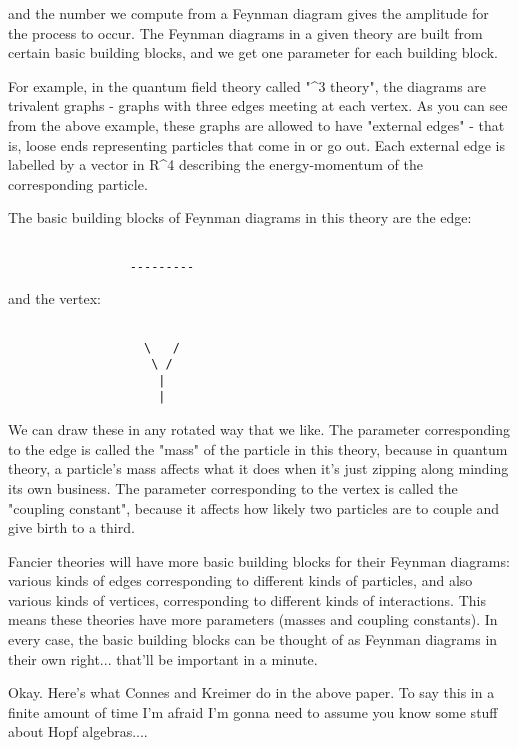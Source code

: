 and the number we compute from a Feynman diagram gives the amplitude 
for the process to occur.  The Feynman diagrams in a given theory 
are built from certain basic building blocks, and we get one parameter 
for each building block.  

For example, in the quantum field theory called "\phi ^3 theory", the 
diagrams are trivalent graphs - graphs with three edges meeting at 
each vertex.  As you can see from the above example, these graphs 
are allowed to have "external edges" - that is, loose ends representing 
particles that come in or go out.   Each external edge is labelled by a 
vector in R^4 describing the energy-momentum of the corresponding particle.  

The basic building blocks of Feynman diagrams in this theory are the
edge:



\begin{verbatim}

                 ---------

\end{verbatim}
    
and the vertex: 
                       

\begin{verbatim}

                   \   / 
                    \ /
                     |
                     |
\end{verbatim}
    
We can draw these in any rotated way that we like.  The parameter 
corresponding to the edge is called the "mass" of the particle in 
this theory, because in quantum theory, a particle's mass affects
what it does when it's just zipping along minding its own business.  
The parameter corresponding to the vertex is called the "coupling 
constant", because it affects how likely two particles are to couple 
and give birth to a third.  

Fancier theories will have more basic building blocks for their Feynman
diagrams: various kinds of edges corresponding to different kinds
of particles, and also various kinds of vertices, corresponding 
to different kinds of interactions.  This means these theories 
have more parameters (masses and coupling constants).  In every 
case, the basic building blocks can be thought of as Feynman 
diagrams in their own right... that'll be important in a minute.

Okay. Here's what Connes and Kreimer do in the above paper.  To
say this in a finite amount of time I'm afraid I'm gonna need to
assume you know some stuff about Hopf algebras....

